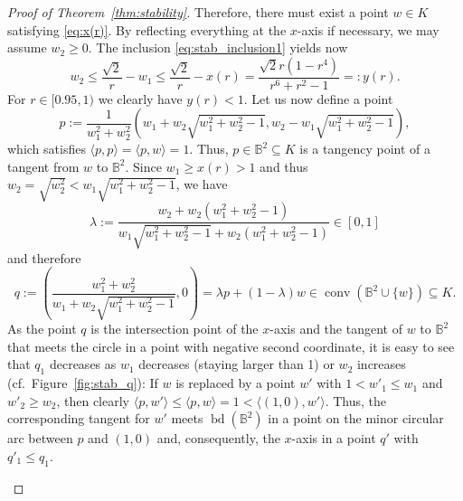 \documentclass[12pt,a4paper]{article}
\theoremstyle{definition}
\DeclareMathOperator{\conv}{conv}
\DeclareMathOperator{\bd}{bd}
\newcommand\B{\mathbb{B}}
\begin{document}
\begin{proof}[Proof of Theorem~\ref{thm:stability}]
Therefore, there must exist a point $w \in K$ satisfying \eqref{eq:x(r)}. By reflecting everything at the $x$-axis if necessary, we may assume $w_2 \geq 0$. The inclusion \eqref{eq:stab_inclusion1} yields now
\begin{equation}
\label{eq:y(r)}
w_2 \leq \frac{\sqrt{2}}{r} - w_1 \leq \frac{\sqrt{2}}{r} - x(r) = \frac{\sqrt{2} r (1 - r^4)}{r^6 + r^2 - 1} =: y(r).
\end{equation}
For $r \in [0.95, 1)$ we clearly have $y(r)<1$. Let us now define a point
$$ p := \frac{1}{w_1^2 + w_2^2} \left( w_1 + w_2 \sqrt{w_1^2+w_2^2-1}, w_2 - w_1 \sqrt{w_1^2+w_2^2-1} \right), $$
which satisfies $\langle p, p \rangle = \langle p, w \rangle = 1$. Thus, $p \in \B^2 \subseteq K$ is a tangency point of a tangent from $w$ to $\B^2$. Since $w_1 \geq x(r) > 1$ and thus $w_2 = \sqrt{w_2^2} < w_1 \sqrt{w_1^2 + w_2^2 - 1}$, we have
$$ \lambda := \frac{w_2 + w_2 (w_1^2 + w_2^2 - 1)}{w_1 \sqrt{w_1^2 + w_2^2 - 1} + w_2 (w_1^2 + w_2^2 - 1)} \in [0,1] $$
and therefore
$$ q := \left( \frac{w_1^2 + w_2^2}{w_1 + w_2 \sqrt{w_1^2 + w_2^2 - 1}}, 0 \right) = \lambda p + (1-\lambda) w \in \conv(\B^2 \cup \{w\}) \subseteq K.$$
As the point $q$ is the intersection point of the $x$-axis and the tangent of $w$ to $\B^2$ that meets the circle in a point with negative second coordinate, it is easy to see that $q_1$ decreases as $w_1$ decreases (staying larger than 1) or $w_2$ increases (cf.~Figure~\ref{fig:stab_q}): If $w$ is replaced by a point $w'$ with $1 < w'_1 \leq w_1$ and $w'_2 \geq w_2$, then clearly $\langle p, w' \rangle \leq \langle p, w \rangle = 1 < \langle (1,0), w' \rangle$. Thus, the corresponding tangent for $w'$ meets $\bd(\B^2)$ in a point on the minor circular arc between $p$ and $(1,0)$ and, consequently, the $x$-axis in a point $q'$ with $q'_1 \leq q_1$.



\begin{figure}[ht]
\def\wx{1.25}
\def\wy{0.5}
\def\wdx{1.125}
\def\wdy{0.7}
\def\px{((\wx+\wy*sqrt(\wx^2+\wy^2-1))/(\wx^2+\wy^2))}
\def\py{((\wy-\wx*sqrt(\wx^2+\wy^2-1))/(\wx^2+\wy^2))}
\def\pdx{((\wdx+\wdy*sqrt(\wdx^2+\wdy^2-1))/(\wdx^2+\wdy^2))}
\def\pdy{((\wdy-\wdx*sqrt(\wdx^2+\wdy^2-1))/(\wdx^2+\wdy^2))}
\def\scale{1.85}
%
\centering
{}
\end{figure}
\end{proof}
\end{document}
